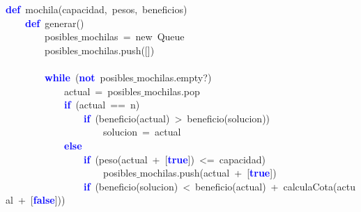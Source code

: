 \noindent
\mbox{}\textbf{\textcolor{Blue}{def}}\ mochila\textcolor{BrickRed}{(}capacidad\textcolor{BrickRed}{,}\ pesos\textcolor{BrickRed}{,}\ beneficios\textcolor{BrickRed}{)} \\
\mbox{}\ \ \ \ \textbf{\textcolor{Blue}{def}}\ generar\textcolor{BrickRed}{()} \\
\mbox{}\ \ \ \ \ \ \ \ posibles$\_$mochilas\ \textcolor{BrickRed}{=}\ new\ Queue \\
\mbox{}\ \ \ \ \ \ \ \ posibles$\_$mochilas\textcolor{BrickRed}{.}push\textcolor{BrickRed}{([])} \\
\mbox{} \\
\mbox{}\ \ \ \ \ \ \ \ \textbf{\textcolor{Blue}{while}}\ \textcolor{BrickRed}{(}\textbf{\textcolor{Blue}{not}}\ posibles$\_$mochilas\textcolor{BrickRed}{.}empty?\textcolor{BrickRed}{)} \\
\mbox{}\ \ \ \ \ \ \ \ \ \ \ \ actual\ \textcolor{BrickRed}{=}\ posibles$\_$mochilas\textcolor{BrickRed}{.}pop \\
\mbox{}\ \ \ \ \ \ \ \ \ \ \ \ \textbf{\textcolor{Blue}{if}}\ \textcolor{BrickRed}{(}actual\ \textcolor{BrickRed}{==}\ n\textcolor{BrickRed}{)} \\
\mbox{}\ \ \ \ \ \ \ \ \ \ \ \ \ \ \ \ \textbf{\textcolor{Blue}{if}}\ \textcolor{BrickRed}{(}beneficio\textcolor{BrickRed}{(}actual\textcolor{BrickRed}{)}\ \textcolor{BrickRed}{\textgreater{}}\ beneficio\textcolor{BrickRed}{(}solucion\textcolor{BrickRed}{))} \\
\mbox{}\ \ \ \ \ \ \ \ \ \ \ \ \ \ \ \ \ \ \ \ solucion\ \textcolor{BrickRed}{=}\ actual \\
\mbox{}\ \ \ \ \ \ \ \ \ \ \ \ \textbf{\textcolor{Blue}{else}} \\
\mbox{}\ \ \ \ \ \ \ \ \ \ \ \ \ \ \ \ \textbf{\textcolor{Blue}{if}}\ \textcolor{BrickRed}{(}peso\textcolor{BrickRed}{(}actual\ \textcolor{BrickRed}{+}\ \textcolor{BrickRed}{[}\textbf{\textcolor{Blue}{true}}\textcolor{BrickRed}{])}\ \textcolor{BrickRed}{\textless{}=}\ capacidad\textcolor{BrickRed}{)} \\
\mbox{}\ \ \ \ \ \ \ \ \ \ \ \ \ \ \ \ \ \ \ \ posibles$\_$mochilas\textcolor{BrickRed}{.}push\textcolor{BrickRed}{(}actual\ \textcolor{BrickRed}{+}\ \textcolor{BrickRed}{[}\textbf{\textcolor{Blue}{true}}\textcolor{BrickRed}{])} \\
\mbox{}\ \ \ \ \ \ \ \ \ \ \ \ \ \ \ \ \textbf{\textcolor{Blue}{if}}\ \textcolor{BrickRed}{(}beneficio\textcolor{BrickRed}{(}solucion\textcolor{BrickRed}{)}\ \textcolor{BrickRed}{\textless{}}\ beneficio\textcolor{BrickRed}{(}actual\textcolor{BrickRed}{)}\ \textcolor{BrickRed}{+}\ calculaCota\textcolor{BrickRed}{(}actual\ \textcolor{BrickRed}{+}\ \textcolor{BrickRed}{[}\textbf{\textcolor{Blue}{false}}\textcolor{BrickRed}{]))} \\
